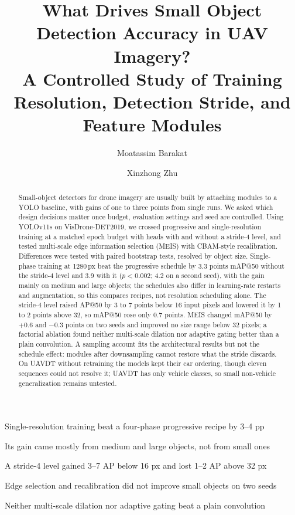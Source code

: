\documentclass[preprint,12pt]{elsarticle}
\begin{document}
\begin{frontmatter}

\title{What Drives Small Object Detection Accuracy in UAV Imagery?\\
A Controlled Study of Training Resolution, Detection Stride, and Feature Modules}

\author[zjnu]{Moatassim Barakat}
\author[zjnu]{Xinzhong Zhu}


\begin{abstract}
Small-object detectors for drone imagery are usually built by attaching modules to
a YOLO baseline, with gains of one to three points from single runs. We asked which
design decisions matter once budget, evaluation settings and seed are controlled. Using YOLOv11s on VisDrone-DET2019, we
crossed progressive and single-resolution training at a matched epoch budget with
heads with and without a stride-4 level, and tested multi-scale edge
information selection (MEIS) with CBAM-style recalibration. Differences were tested
with paired bootstrap tests, resolved by object size.
Single-phase training at 1280\,px beat the progressive schedule by 3.3 points mAP@50
without the stride-4 level and 3.9 with it ($p<0.002$; 4.2 on a
second seed), with the gain mainly on medium and large objects; the schedules
also differ in learning-rate restarts and augmentation, so this compares recipes,
not resolution scheduling alone. The stride-4 level raised AP@50 by 3 to 7
points below 16 input pixels and lowered it by 1 to 2 points above 32, so mAP@50
rose only 0.7 points. MEIS changed mAP@50 by $+0.6$ and $-0.3$
points on two seeds and improved no size range below 32 pixels; a factorial ablation
found neither multi-scale dilation nor adaptive gating better than a plain
convolution. A sampling account fits the architectural results but not the schedule
effect: modules after downsampling cannot restore what the stride discards.
On UAVDT without retraining the models kept their car ordering, though eleven sequences could not resolve it;
UAVDT has only vehicle classes, so small non-vehicle generalization remains untested.
\end{abstract}

\begin{highlights}
\item Single-resolution training beat a four-phase progressive recipe by 3--4 pp
\item Its gain came mostly from medium and large objects, not from small ones
\item A stride-4 level gained 3--7 AP below 16 px and lost 1--2 AP above 32 px
\item Edge selection and recalibration did not improve small objects on two seeds
\item Neither multi-scale dilation nor adaptive gating beat a plain convolution
\end{highlights}


\end{frontmatter}
\end{document}
